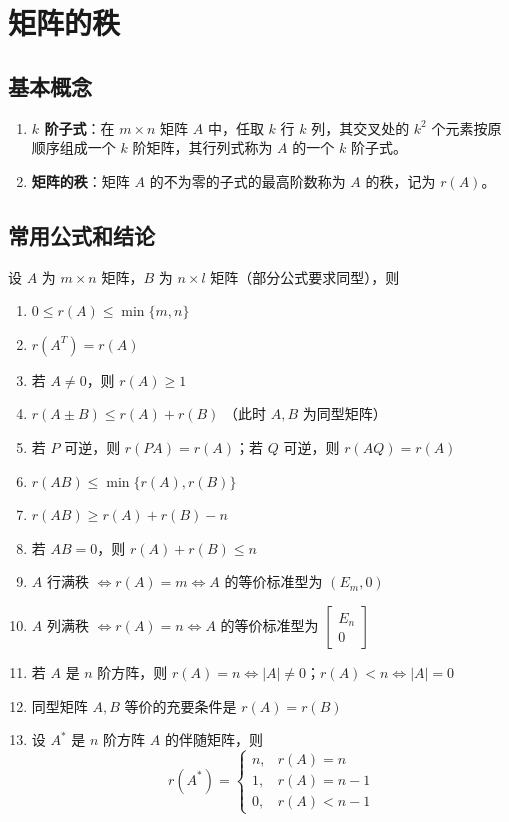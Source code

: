 \documentclass[UTF8]{ctexart}
\theoremstyle{mydef}
\begin{document}
\section{矩阵的秩}

\subsection{基本概念}
\begin{enumerate}
    \item \textbf{$k$ 阶子式}：在 $m \times n$ 矩阵 $A$ 中，任取 $k$ 行 $k$ 列，其交叉处的 $k^2$ 个元素按原顺序组成一个 $k$ 阶矩阵，其行列式称为 $A$ 的一个 $k$ 阶子式。
    \item \textbf{矩阵的秩}：矩阵 $A$ 的不为零的子式的最高阶数称为 $A$ 的秩，记为 $r(A)$。
\end{enumerate}

\subsection{常用公式和结论}
设 $A$ 为 $m \times n$ 矩阵，$B$ 为 $n \times l$ 矩阵（部分公式要求同型），则
\begin{enumerate}
    \item $0 \le r(A) \le \min\{m, n\}$
    \item $r(A^T) = r(A)$
    \item 若 $A \neq 0$，则 $r(A) \ge 1$
    \item $r(A \pm B) \le r(A) + r(B)$ （此时 $A, B$ 为同型矩阵）
    \item 若 $P$ 可逆，则 $r(PA) = r(A)$；若 $Q$ 可逆，则 $r(AQ) = r(A)$
    \item $r(AB) \le \min\{r(A), r(B)\}$
    \item $r(AB) \ge r(A) + r(B) - n$
    \item 若 $AB = 0$，则 $r(A) + r(B) \le n$
    \item $A$ 行满秩 $\iff r(A) = m \iff A$ 的等价标准型为 $(E_m, 0)$
    \item $A$ 列满秩 $\iff r(A) = n \iff A$ 的等价标准型为 $\begin{bmatrix} E_n \\ 0 \end{bmatrix}$
    \item 若 $A$ 是 $n$ 阶方阵，则 $r(A) = n \iff |A| \neq 0$；$r(A) < n \iff |A| = 0$
    \item 同型矩阵 $A, B$ 等价的充要条件是 $r(A) = r(B)$
    \item 设 $A^*$ 是 $n$ 阶方阵 $A$ 的伴随矩阵，则
    $$
    r(A^*) = \begin{cases}
    n, & r(A) = n \\
    1, & r(A) = n-1 \\
    0, & r(A) < n-1
    \end{cases}
    $$
\end{enumerate}
\end{document}

